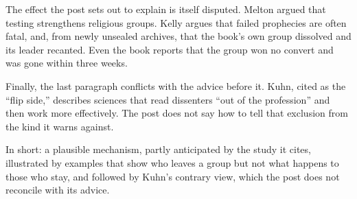 \begin{afterword}
The effect the post sets out to explain is itself disputed. Melton argued that testing strengthens religious groups. Kelly argues that failed prophecies are often fatal, and, from newly unsealed archives, that the book's own group dissolved and its leader recanted. Even the book reports that the group won no convert and was gone within three weeks.

Finally, the last paragraph conflicts with the advice before it. Kuhn, cited as the ``flip side,'' describes sciences that read dissenters ``out of the profession'' and then work more effectively. The post does not say how to tell that exclusion from the kind it warns against.

In short: a plausible mechanism, partly anticipated by the study it cites, illustrated by examples that show who leaves a group but not what happens to those who stay, and followed by Kuhn's contrary view, which the post does not reconcile with its advice.
\end{afterword}
